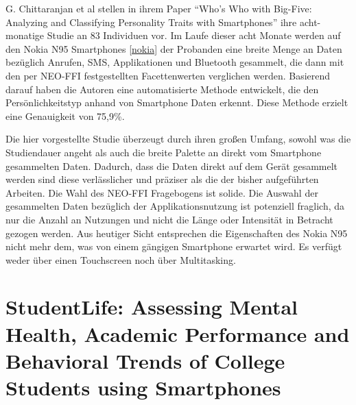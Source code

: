 G. Chittaranjan et al stellen in ihrem Paper "`Who’s Who with Big-Five: Analyzing and Classifying Personality Traits with Smartphones"' ihre acht-monatige Studie an 83 Individuen vor.
Im Laufe dieser acht Monate werden auf den Nokia N95 Smartphones \ref{nokia} der Probanden eine breite Menge an Daten bezüglich Anrufen, SMS, Applikationen und Bluetooth gesammelt, 
die dann mit den per NEO-FFI festgestellten Facettenwerten verglichen werden.
Basierend darauf haben die Autoren eine automatisierte Methode entwickelt, die den Persönlichkeitstyp anhand von Smartphone Daten erkennt.
Diese Methode erzielt eine Genauigkeit von 75,9\%.
\par
Die hier vorgestellte Studie überzeugt durch ihren großen Umfang, sowohl was die Studiendauer angeht als auch die breite Palette an direkt vom Smartphone gesammelten Daten.
Dadurch, dass die Daten direkt auf dem Gerät gesammelt werden sind diese verlässlicher und präziser als die der bisher aufgeführten Arbeiten.
Die Wahl des NEO-FFI Fragebogens ist solide.
Die Auswahl der gesammelten Daten bezüglich der Applikationsnutzung ist potenziell fraglich, da nur die Anzahl an Nutzungen und nicht die Länge oder Intensität in Betracht gezogen werden.
Aus heutiger Sicht entsprechen die Eigenschaften des Nokia N95 nicht mehr dem, was von einem gängigen Smartphone erwartet wird.
Es verfügt weder über einen Touchscreen noch über Multitasking.


\section*{StudentLife: Assessing Mental Health, Academic Performance and Behavioral Trends of College Students using Smartphones}

